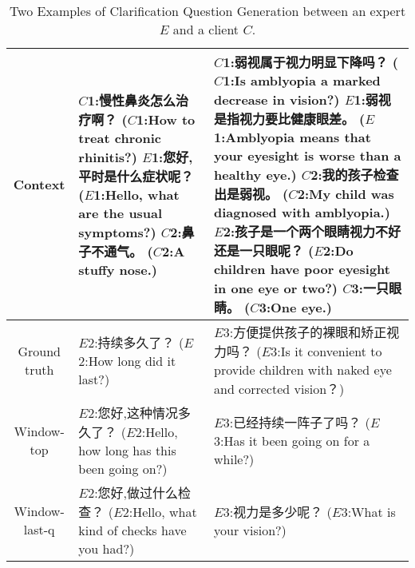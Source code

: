 \begin{CJK}{UTF8}{gbsn}
\begin{table*}[!htbp]
\small
\begin{tabular}{c|l|l}
\toprule
Context&\makecell[l]{$C$1:慢性鼻炎怎么治疗啊？\\($C$1:How to treat chronic rhinitis?)\\$E$1:您好,平时是什么症状呢？\\($E$1:Hello, what are the usual symptoms?)\\$C$2:鼻子不通气。\\($C$2:A stuffy nose.)}&\makecell[l]{$C$1:弱视属于视力明显下降吗？\\($C$1:Is amblyopia a marked decrease in vision?)\\$E$1:弱视是指视力要比健康眼差。\\($E$1:Amblyopia means that your eyesight is worse than\\ a healthy eye.)\\$C$2:我的孩子检查出是弱视。\\($C$2:My child was diagnosed with amblyopia.)\\ $E$2:孩子是一个两个眼睛视力不好还是一只眼呢？\\($E$2:Do children have poor eyesight in one eye or two?)\\$C$3:一只眼睛。\\ ($C$3:One eye.)}\\
\hline
Ground truth&\makecell[l]{$E$2:持续多久了？\\($E$2:How long did it last?)}&\makecell[l]{$E$3:方便提供孩子的裸眼和矫正视力吗？\\($E$3:Is it convenient to provide children with naked eye\\ and corrected vision？)}\\
\hline
Window-top&\makecell[l]{$E$2:您好,这种情况多久了？\\($E$2:Hello, how long has this been going on?)}&\makecell[l]{$E$3:已经持续一阵子了吗？\\($E$3:Has it been going on for a while?)}\\
\hline
Window-last-q&\makecell[l]{$E$2:您好,做过什么检查？\\($E$2:Hello, what kind of checks have you had?)}&\makecell[l]{$E$3:视力是多少呢？\\($E$3:What is your vision?)}\\
\bottomrule
\end{tabular}
\caption{Two Examples of Clarification Question Generation between an expert $E$ and a client $C$.}
\label{tab:example2}
\end{table*}
\end{CJK}

